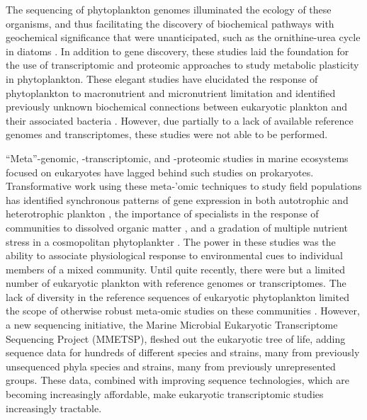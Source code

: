 The sequencing of phytoplankton genomes \citep{Armbrust2004,Derelle2006,Read2013,Worden2009,Gobler2011a,Bowler2008} illuminated the ecology of these organisms, and thus facilitating the discovery of biochemical pathways with geochemical significance that were unanticipated, such as the ornithine-urea cycle in diatoms \citep{Armbrust2004}. In addition to gene discovery, these studies laid the foundation for the use of transcriptomic \citep{Mock2008, Dyhrman2012,Mock2008} and proteomic \citep{Wurch2011,Bertrand2012a,Jones2013} approaches to study metabolic plasticity in phytoplankton. These elegant studies have elucidated the response of phytoplankton to macronutrient  \citep{Rokitta2014, Dyhrman2012,Wurch2011,Shrestha2012,Mock2008,Bender2014,Allen2011} and micronutrient limitation \citep{Lommer2012,Nunn2013,Allen2008,Marchetti2009a, Bertrand2012a} and identified previously unknown biochemical connections between eukaryotic plankton and their associated bacteria \citep{Durham2015}. However, due partially to a lack of available reference genomes and transcriptomes, these studies were not able to be performed.  \par
        
``Meta''-genomic, -transcriptomic, and -proteomic studies in marine ecosystems focused on eukaryotes have lagged behind such studies on prokaryotes. Transformative work using these meta-'omic techniques to study field populations has identified synchronous patterns of gene expression in both autotrophic and heterotrophic plankton \citep{Ottesen2014,Ottesen2013}, the importance of specialists in the response of communities to dissolved organic matter \citep{McCarren2010}, and a gradation of multiple nutrient stress in a cosmopolitan phytoplankter \citep{Saito2014}. The power in these studies was the ability to associate physiological response to environmental cues to individual members of a mixed community. Until quite recently, there were but a limited  number of eukaryotic plankton with reference genomes or transcriptomes. The lack of diversity in the reference sequences of eukaryotic phytoplankton limited the scope of otherwise robust meta-omic studies on these communities \citep{Marchetti2012a}. However, a new sequencing initiative, the Marine Microbial Eukaryotic Transcriptome Sequencing Project (MMETSP), fleshed out the eukaryotic tree of life, adding sequence data for hundreds of different species and strains, many from previously unsequenced phyla \citep{Keeling2014} species and strains, many from previously unrepresented groups. These data, combined with improving sequence technologies, which are becoming increasingly affordable, make eukaryotic transcriptomic studies increasingly tractable. 


